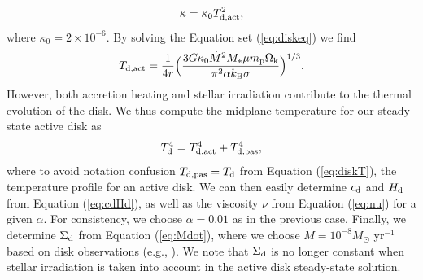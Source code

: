 \documentclass[apj]{emulateapj}
\begin{document}
\begin{equation}
\label{eq:opacity}
\kappa=\kappa_0 T_{\rm d, act}^2,
\end{equation}
where $\kappa_0=2 \times 10^{-6}$. By solving the Equation set (\ref{eq:diskeq}) we find
\begin{equation}
\label{eq:Tdact}
T_{\rm d, act}=\frac{1}{4 r} \Big(\frac{3 G \kappa_0\dot{M}^2 M_* \mu m_{\rm p} \Omega_{\rm k}}{\pi^2 \alpha k_{\rm B} \sigma}\Big)^{1/3}.
\end{equation}
However, both accretion heating and stellar irradiation contribute to the thermal evolution of the disk. We thus compute the midplane temperature for our steady-state active disk as
\begin{equation}
\label{eq:activeT}
T_{\rm d}^4 = T_{\rm d, act}^4 + T_{\rm d, pas}^4,
\end{equation}
where to avoid notation confusion $T_{\rm d, pas}=T_{\rm d}$ from Equation (\ref{eq:diskT}), the temperature profile for an active disk. We can then easily determine  $c_{\rm d}$ and $H_{\rm d}$ from Equation (\ref{eq:cdHd}), as well as the viscosity $\nu$ from Equation (\ref{eq:nu}) for a given $\alpha$. For consistency, we choose  $\alpha=0.01$ as in the previous case. Finally, we determine $\Sigma_{\rm d}$ from Equation (\ref{eq:Mdot}), where we choose $\dot{M}=10^{-8} M_{\odot}$ yr$^{-1}$ based on disk observations (e.g., \citealt{andrews10}). We note that $\Sigma_{\rm d}$ is no longer constant when stellar irradiation is taken into account in the active disk steady-state solution. 


\end{document}

